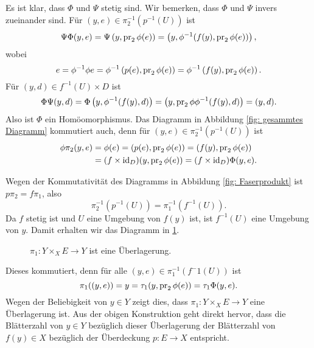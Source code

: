 \documentclass[a4paper,10pt]{article}
\begin{document}
Es ist klar, dass $\Phi$ und $\Psi$ stetig sind. Wir bemerken, dass $\Phi$ und $\Psi$ invers zueinander sind. Für $(y,e) \in \pi_2^{-1}(p^{-1}(U))$ ist
\[
 \Psi \Phi (y,e)
 = \Psi \left( y, \operatorname{pr}_2 \phi(e) \right)
 = \left( y, \phi^{-1}(f(y), \operatorname{pr}_2 \phi(e)) \right),
\]
wobei
\[
 e
 = \phi^{-1} \phi e
 = \phi^{-1}\left( p(e), \operatorname{pr}_2 \phi(e) \right)
 = \phi^{-1}\left( f(y), \operatorname{pr}_2 \phi(e) \right).
\]
Für $(y,d) \in f^{-1}(U) \times D$ ist
\[
 \Phi \Psi (y,d)
 = \Phi\left( y, \phi^{-1}(f(y),d) \right)
 = \left( y, \operatorname{pr}_2 \phi \phi^{-1}(f(y),d) \right)
 = (y,d).
\]
Also ist $\Phi$ ein Homöomorphismus. Das Diagramm in Abbildung \ref{fig: gesammtes Diagramm} kommutiert auch, denn für $(y,e) \in \pi_2^{-1}(p^{-1}(U))$ ist
\begin{align*}
 \phi \pi_2 (y,e)
 &= \phi(e)
 = (p(e), \operatorname{pr}_2 \phi(e))
 = (f(y), \operatorname{pr}_2 \phi(e)) \\
 &= (f \times \operatorname{id}_D) (y, \operatorname{pr}_2 \phi(e))
 = (f \times \operatorname{id}_D) \Phi (y,e).
\end{align*}

Wegen der Kommutativität des Diagramms in Abbildung \ref{fig: Faserprodukt} ist $p \pi_2 = f \pi_1$, also
\[
 \pi_2^{-1}(p^{-1}(U)) = \pi_1^{-1}(f^{-1}(U)).
\]
Da $f$ stetig ist und $U$ eine Umgebung von $f(y)$ ist, ist $f^{-1}(U)$ eine Umgebung von $y$. Damit erhalten wir das Diagramm in \ref{fig: Überlagerung für f^-1 U}.
\begin{figure}[ht]\centering
 \caption{$\pi_1 : Y \times_X E \to Y$ ist eine Überlagerung.}
 \label{fig: Überlagerung für f^-1 U}
\end{figure}
Dieses kommutiert, denn für alle $(y,e) \in \pi_1^{-1}(f^-1(U))$ ist
\[
 \pi_1((y,e)) = y = \tau_1 (y, \operatorname{pr}_2 \phi(e)) = \tau_1 \Phi(y,e).
\]
Wegen der Beliebigkeit von $y \in Y$ zeigt dies, dass $\pi_1 : Y \times_X E \to Y$ eine Überlagerung ist. Aus der obigen Konstruktion geht direkt hervor, dass die Blätterzahl von $y \in Y$ bezüglich dieser Überlagerung der Blätterzahl von $f(y) \in X$ bezüglich der Überdeckung $p : E \to X$ entspricht.
\end{document}
